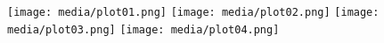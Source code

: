 \documentclass{report}
\begin{document}
\texttt{[image: media/plot01.png]}
\texttt{[image: media/plot02.png]}
\texttt{[image: media/plot03.png]}
\texttt{[image: media/plot04.png]}
\end{document}

